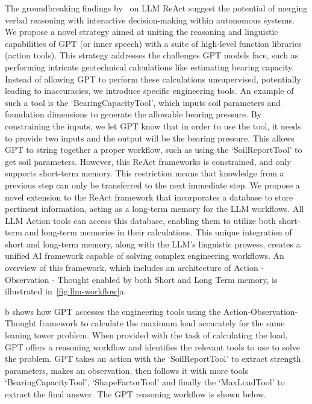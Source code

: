 \documentclass{article}
\begin{document}
The groundbreaking findings by~\textcite{yao2022react} on LLM ReAct suggest the potential of merging verbal reasoning with interactive decision-making within autonomous systems. We propose a novel strategy aimed at uniting the reasoning and linguistic capabilities of GPT (or inner speech) with a suite of high-level function libraries (action tools). This strategy addresses the challenges GPT models face, such as performing intricate geotechnical calculations like estimating bearing capacity. Instead of allowing GPT to perform these calculations unsupervised, potentially leading to inaccuracies, we introduce specific engineering tools. An example of such a tool is the `BearingCapacityTool', which inputs soil parameters and foundation dimensions to generate the allowable bearing pressure. By constraining the inputs, we let GPT know that in order to use the tool, it needs to provide two inputs and the output will be the bearing pressure. This allows GPT to string together a proper workflow, such as using the `SoilReportTool' to get soil parameters. However, this ReAct frameworks is constrained, and only supports short-term memory. This restriction means that knowledge from a previous step can only be transferred to the next immediate step. We propose a novel extension to the ReAct framework that incorporates a database to store pertinent information, acting as a long-term memory for the LLM workflows. All LLM Action tools can access this database, enabling them to utilize both short-term and long-term memories in their calculations. This unique integration of short and long-term memory, along with the LLM's linguistic prowess, creates a unified AI framework capable of solving complex engineering workflows. An overview of this framework, which includes an architecture of Action - Observation - Thought enabled by both Short and Long Term memory, is illustrated in~\cref{fig:llm-workflow}a. 

b shows how GPT accesses the engineering tools using the Action-Observation-Thought framework to calculate the maximum load accurately for the same leaning tower problem. When provided with the task of calculating the load, GPT offers a reasoning workflow and identifies the relevant tools to use to solve the problem. GPT takes an action with the `SoilReportTool' to extract strength parameters, makes an observation, then follows it with more tools `BearingCapacityTool', `ShapeFactorTool' and finally the `MaxLoadTool' to extract the final answer. The GPT reasoning workflow is shown below.
\end{document}
